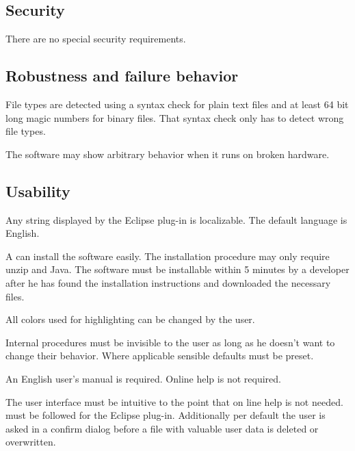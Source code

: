 \subsection{Security}
There are no special security requirements.

\subsection{Robustness and failure behavior} \label{nf:Robustness and failure behavior}
File types are detected using a syntax check for plain text files and at least 64 bit long magic numbers for binary files. That syntax check only has to detect wrong file types.
\par
The software may show arbitrary behavior when it runs on broken hardware.

\subsection{Usability} \label{nf:Usability}
Any string displayed by the Eclipse plug-in is localizable. The default language is English.
\par
A  can install the software easily. The installation procedure may only require unzip and Java. The software must be installable within 5 minutes by a developer after he has found the installation instructions and downloaded the necessary files. %
\par
All colors used for highlighting can be changed by the user.
\par
Internal procedures must be invisible to the user as long as he doesn't want to change their behavior. Where applicable sensible defaults must be preset.
\par
An English user's manual is required. Online help is not required.
\par
The user interface must be intuitive to the point that on line help is not needed.  must be followed for the Eclipse plug-in. Additionally per default the user is asked in a confirm dialog before a file with valuable user data is deleted or overwritten. 

